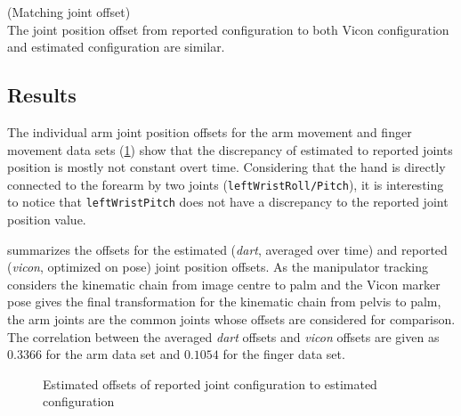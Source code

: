 \begin{hypothesis}(Matching joint offset)\\
The joint position offset from reported configuration to both Vicon configuration and estimated configuration are similar.
\label{hyp:matching_joint_offset}
\end{hypothesis}

\subsection{Results}

The individual arm joint position offsets for the arm movement and finger movement data sets (\cref{fig:estimated_offsets}) show that the discrepancy of estimated to reported joints position is mostly not constant overt time. Considering that the hand is directly connected to the forearm by two joints (\texttt{leftWristRoll/Pitch}), it is interesting to notice that \texttt{leftWristPitch} does not have a discrepancy to the reported joint position value.

 summarizes the offsets for the estimated (\textit{dart}, averaged over time) and reported (\textit{vicon}, optimized on pose) joint position offsets. As the manipulator tracking considers the kinematic chain from image centre to palm and the Vicon marker pose gives the final transformation for the kinematic chain from pelvis to palm, the arm joints are the common joints whose offsets are considered for comparison.
The correlation between the averaged \textit{dart} offsets and \textit{vicon} offsets are given as $0.3366$ for the arm data set and $0.1054$ for the finger data set.

\begin{figure}
\centering
{}

\caption{Estimated offsets of reported joint configuration to estimated configuration}
\label{fig:estimated_offsets}
\end{figure}


